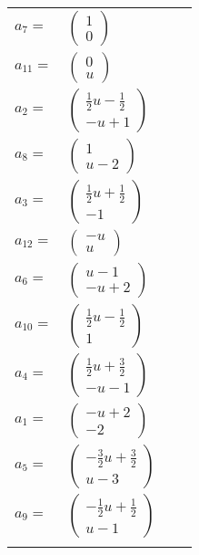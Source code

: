 \documentclass[1p]{elsarticle_modified}
\theoremstyle{definition}
\begin{document}
\begin{tabular}{m{7pt} m{180pt} m{7pt} m{180pt} }
\flushright $a_{7}=$&$\begin{pmatrix}1\\0\end{pmatrix}$ \\
\flushright $a_{11}=$&$\begin{pmatrix}0\\u\end{pmatrix}$ \\
\flushright $a_{2}=$&$\begin{pmatrix}\frac{1}{2} u-\frac{1}{2}\\- u+1\end{pmatrix}$ \\
\flushright $a_{8}=$&$\begin{pmatrix}1\\u-2\end{pmatrix}$ \\
\flushright $a_{3}=$&$\begin{pmatrix}\frac{1}{2} u+\frac{1}{2}\\-1\end{pmatrix}$ \\
\flushright $a_{12}=$&$\begin{pmatrix}- u\\u\end{pmatrix}$ \\
\flushright $a_{6}=$&$\begin{pmatrix}u-1\\- u+2\end{pmatrix}$ \\
\flushright $a_{10}=$&$\begin{pmatrix}\frac{1}{2} u-\frac{1}{2}\\1\end{pmatrix}$ \\
\flushright $a_{4}=$&$\begin{pmatrix}\frac{1}{2} u+\frac{3}{2}\\- u-1\end{pmatrix}$ \\
\flushright $a_{1}=$&$\begin{pmatrix}- u+2\\-2\end{pmatrix}$ \\
\flushright $a_{5}=$&$\begin{pmatrix}-\frac{3}{2} u+\frac{3}{2}\\u-3\end{pmatrix}$ \\
\flushright $a_{9}=$&$\begin{pmatrix}-\frac{1}{2} u+\frac{1}{2}\\u-1\end{pmatrix}$\\&\end{tabular}
\end{document}
